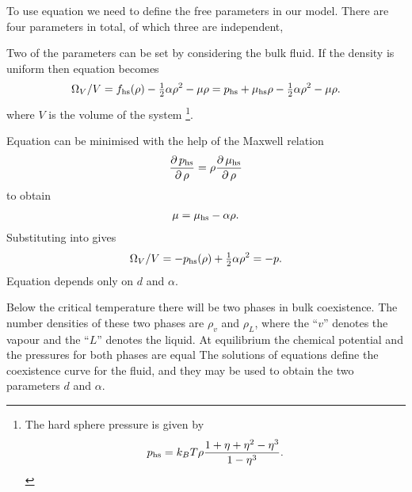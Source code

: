 To use equation  
we need to define the free parameters in our model.
There are four parameters in total, of which three are independent,

Two of the parameters can be set by considering the bulk fluid.
If the density is uniform then equation  becomes
\begin{align}
   \Omega_V/V =  f_{\text{hs}}(\rho)  -  \tfrac{1}{2}\alpha \rho^2 -  \mu \rho= p_{\text{hs}} + \mu_{\text{hs}} \rho  -  \tfrac{1}{2} \alpha \rho^2 -  \mu \rho. \label{eqn:nuc:OmegaVBulk}
\end{align}
where $V$ is the volume of the system%
\footnote{The hard sphere pressure is given by
\begin{align}
 p_{\text{hs}} = k_B T \rho \frac{1+\eta +\eta^2-\eta^3}{1-\eta^3}. \label{eqn:nuc:HSpressure}
\end{align}
}.

Equation   can be minimised with the help of the Maxwell relation
\begin{align}
  \frac{\operatorname{\partial} p_{\text{hs}}}{\operatorname{\partial} \rho} = \rho \frac{\operatorname{\partial} \mu_{\text{hs}}}{\operatorname{\partial} \rho} 
\end{align}
to obtain
\begin{align}
  \mu = \mu_{\text{hs}} - \alpha \rho. \label{eqn:nuc:muBulk}
\end{align}
Substituting  into  gives
\begin{align}
   \Omega_V/V = -p_{\text{hs}}(\rho) + \tfrac{1}{2} \alpha \rho^2 = -p.
   \label{eqn:nuc:OmegaVBulkP}
\end{align}
Equation  depends only on $d$ and $\alpha$.

Below the critical temperature there will be 
two phases in  bulk coexistence.
The number densities of these two phases are $\rho_v$ and $\rho_L$,
where the ``$v$'' denotes the vapour and the ``$L$'' denotes the liquid.
At equilibrium the chemical potential and the pressures for both phases are equal
The solutions of equations  define the coexistence curve for the fluid,
and they may be used to obtain the two parameters $d$ and $\alpha$.

